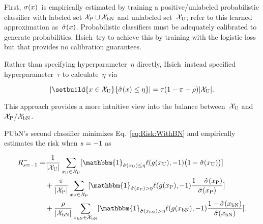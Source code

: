 First, $\sigma(x)$~is empirically estimated by training a positive\-/unlabeled probabilistic classifier with labeled set ${\mathcal{X}_{\textnormal{P}} \sqcup \mathcal{X}_{\textnormal{bN}}}$ and unlabeled set~$\mathcal{X}_{\textnormal{U}}$; refer to this learned approximation as~$\hat{\sigma}(x)$.  Probabilistic classifiers must be adequately calibrated to generate probabilities.  Hsieh\etal\ try to achieve this by training with the logistic loss but that provides no calibration guarantees.~\cite{Guo:2017}

Rather than specifying hyperparameter~$\eta$ directly, Hsieh\etal\ instead specified hyperparameter~$\tau$ to calculate~$\eta$ via

\begin{equation}\label{eq:EtaCalculation}
  \abs{\setbuild{\X \in \utrain}{\hsigX \leq \eta}} = \tau (1 - \prior - \plabel)\abs{\utrain} \text{.}
\end{equation}

\noindent
This approach provides a more intuitive view into the balance between~$\mathcal{X}_{\textnormal{U}}$ and $\mathcal{X}_{\textnormal{P}}$/$\mathcal{X}_{\textnormal{bN}}$.

PUbN's second classifier minimizes Eq.~\eqref{eq:Risk:WithBN} and empirically estimates the risk when ${s = {-}1}$ as

\begin{equation}\label{eq:EmpRisk:PUbN:Latent}
  \begin{aligned}
    \smrisk = &\frac{1}{\abs{\utrain}} \sum_{\xvar{U} \in \utrain} \sbrack{\mathbbm{1}_{\hsig(\xvar{U}) \leq \eta} \floss{\dec(\xvar{U})}{\ncls} \big(1 - \hsig(\xvar{U})\big)} \\
              &+\frac{\prior}{\abs{\ptrain}} \sum_{\xvar{P} \in \ptrain} \sbrack{\mathbbm{1}_{\hsig(\xvar{P}) > \eta} \floss{\dec(\xvar{P})}{\ncls} \frac{1 - \hsig(\xvar{P})}{\hsig(\xvar{P})}} \\
              &+\frac{\plabel}{\abs{\bntrain}} \sum_{\xvar{bN} \in \bntrain} \sbrack{\mathbbm{1}_{\hsig(\xvar{bN}) > \eta} \floss{\dec(\xvar{bN})}{\ncls} \frac{1 - \hsig(\xvar{bN})}{\hsig(\xvar{bN})}} \text{.}
  \end{aligned}
\end{equation}
